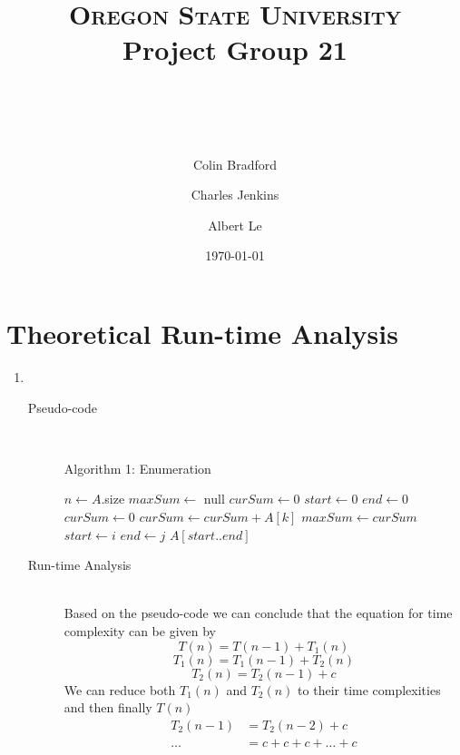 \documentclass[paper=a4, fontsize=11pt]{scrartcl} %
\title{ 
    \normalfont \normalsize 
    \textsc{Oregon State University} \\ [25pt]
    \large Project Group 21
    \horrule{0.5pt} \\[0.4cm] %
    \huge \hwtitle \\ %
    \horrule{2pt} \\[0.5cm] %
}
\author{
    Colin Bradford
    \and
    Charles Jenkins
    \and
    Albert Le
} %
\date{\normalsize\today} %
\numberwithin{equation}{section} %
\numberwithin{figure}{section} %
\numberwithin{table}{section} %
\begin{document}
\maketitle %


\section{Theoretical Run-time Analysis}
\begin{enumerate}[label=\bfseries Algorithm \arabic*:]
    \item \hfill \\
    \begin{description}
        \item[Pseudo-code] \hfill \\
        \begin{algorithmc}
            \caption{Algorithm 1: Enumeration}
                \State $n \gets A$.size
                \State $maxSum \gets$ null
                \State $curSum \gets 0$
                \State $start \gets 0$
                \State $end \gets 0$
                        \State $curSum \gets 0$
                            \State $curSum \gets curSum + A[k]$
                        \EndFor
                            \State $maxSum \gets curSum$
                            \State $start \gets i$
                            \State $end \gets j$
                        \EndIf
                    \EndFor
                \EndFor
                \State \Return $A[start..end]$
            \EndFunction
        \end{algorithmc}
        \item[Run-time Analysis] \hfill \\
        Based on the pseudo-code we can conclude that the equation for 
        time complexity can be given by
        \[ T(n) = T(n - 1) + T_1(n) \]
        \[ T_1(n) = T_1(n - 1) + T_2(n) \]
        \[ T_2(n) = T_2(n - 1) + c \]
        We can reduce both $T_1(n)$ and $T_2(n)$ to their time complexities
        and then finally $T(n)$
        \begin{align*}
            T_2(n - 1) & = T_2(n - 2) + c \\
            \ldots & = c + c + c + \ldots + c \\

\end{align*}
\end{description}
\end{enumerate}
\end{document}
